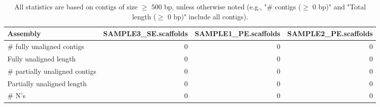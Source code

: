 \documentclass[12pt,a4paper]{article}
\begin{document}
\begin{table}[ht]
\begin{center}
\caption{All statistics are based on contigs of size $\geq$ 500 bp, unless otherwise noted (e.g., "\# contigs ($\geq$ 0 bp)" and "Total length ($\geq$ 0 bp)" include all contigs).}
\begin{tabular}{|l*{3}{|r}|}
\hline
Assembly & SAMPLE3\_SE.scaffolds & SAMPLE1\_PE.scaffolds & SAMPLE2\_PE.scaffolds \\ \hline
\# fully unaligned contigs & 0 & 0 & 0 \\ \hline
Fully unaligned length & 0 & 0 & 0 \\ \hline
\# partially unaligned contigs & 0 & 0 & 0 \\ \hline
Partially unaligned length & 0 & 0 & 0 \\ \hline
\# N's & 0 & 0 & 0 \\ \hline
\end{tabular}
\end{center}
\end{table}
\end{document}
